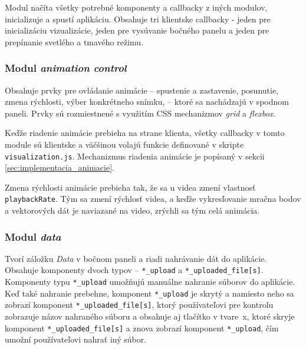 Modul načíta všetky potrebné komponenty a callbacky z iných modulov, inicializuje a spustí aplikáciu. Obsahuje tri klientske callbacky - jeden pre inicializáciu vizualizácie, jeden pre vysúvanie bočného panelu a jeden pre prepínanie svetlého a tmavého režimu.

\subsubsection{Modul \emph{animation control} }

Obsahuje prvky pre ovládanie animácie -- spustenie a zastavenie, posunutie, zmena rýchlosti, výber konkrétneho snímku, -- ktoré sa nachádzajú v spodnom paneli. Prvky sú rozmiestnené s využitím CSS mechanizmov \emph{grid} a \emph{flexbox}.

Keďže riadenie animácie prebieha na strane klienta, všetky callbacky v tomto module sú klientske a väčšinou volajú funkcie definované v skripte \texttt{visualization.js}. Mechanizmus riadenia animácie je popísaný v sekcii \ref{sec:implementacia_animacie}.

Zmena rýchlosti animácie prebieha tak, že sa u videa zmení vlastnosť \texttt{playbackRate}. Tým sa zmení rýchlosť videa, a keďže vykresľovanie mračna bodov a vektorových dát je naviazané na video, zrýchli sa tým celá animácia.

\subsubsection{Modul \emph{data} }

Tvorí záložku \emph{Data} v bočnom paneli a riadi nahrávanie dát do aplikácie. Obsahuje komponenty dvoch typov -- \texttt{*\_upload} a \texttt{*\_uploaded\_file[s]}. Komponenty typu \texttt{*\_upload} umožňujú manuálne nahranie súborov do aplikácie. Keď také nahranie prebehne, komponent \texttt{*\_upload} je skrytý a namiesto neho sa zobrazí komponent \texttt{*\_uploaded\_file[s]}, ktorý používateľovi pre kontrolu zobrazuje názov nahraného súboru a obsahuje aj tlačítko v tvare~x, ktoré skryje komponent \texttt{*\_uploaded\_file[s]} a znova zobrazí komponent \texttt{*\_upload}, čím umožní používateľovi nahrať iný súbor.

